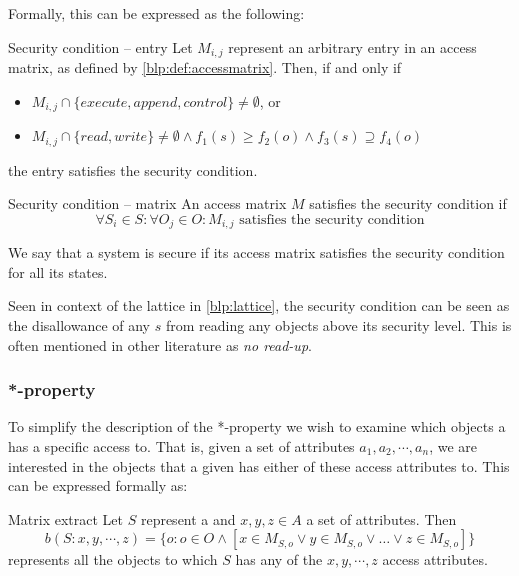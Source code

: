 Formally, this can be expressed as the following:
\begin{definition}{Security condition -- entry}
Let $M_{i,j}$ represent an arbitrary entry in an access matrix, as defined by \cref{blp:def:accessmatrix}.
Then, if and only if
\begin{itemize}
  \item $M_{i,j} \cap \{execute, append, control\} \neq \emptyset$, or
  \item $M_{i,j} \cap \{read, write\} \neq \emptyset \wedge f_1(s) \ge f_2(o) \wedge f_3(s) \supseteq f_4(o)$
\end{itemize}
the entry satisfies the security condition.

\end{definition}
\begin{definition}{Security condition -- matrix}
An access matrix $M$ satisfies the security condition if
$$\forall S_i \in S: \forall O_j \in O: M_{i,j} \text{ satisfies the security condition}$$

We say that a system is secure if its access matrix satisfies the security condition for all its states.
\end{definition}

Seen in context of the lattice in \cref{blp:lattice}, the security condition can be seen as the disallowance of any \ssubject{} $s$ from reading any objects above its security level.
This is often mentioned in other literature as \emph{no read-up}.

\subsubsection{*-property}
To simplify the description of the *-property we wish to examine which objects a \principal{} has a specific access to.
That is, given a set of attributes $a_1, a_2, \cdots, a_n$, we are interested in the objects that a given \principal{} has either of these access attributes to.
This can be expressed formally as:

\begin{definition}{Matrix extract}
  Let $S$ represent a \principal{} and $x,y,z \in A$ a set of attributes.
  Then $$b(S:x, y, \cdots, z) = \{o:o\in O \wedge [x \in M_{S,o} \vee y \in M_{S,o} \vee \dots \vee z \in M_{S,o}]\}$$
  represents all the objects to which $S$ has any of the $x, y, \cdots, z$ access attributes.
\end{definition}

